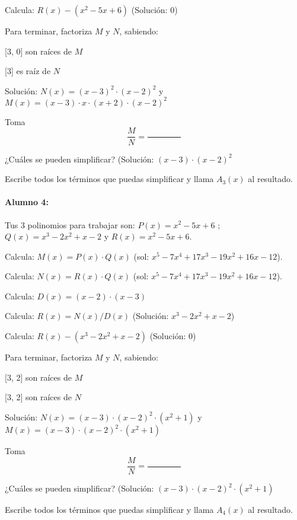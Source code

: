 Calcula: $R(x) - ( x^2 - 5x + 6 )$ (Solución: $ 0 $)

Para terminar, factoriza $M$ y $N$, sabiendo:

     [3, 0]  son raíces de $M$

     [3]  es raíz de $N$

Solución: $N(x) =  (x - 3)^2 \cdot  (x - 2)^2 $ y $M(x) =  (x - 3) \cdot  x \cdot  (x + 2) \cdot  (x - 2)^2 $

Toma \[\frac{M}{N} = \frac{\quad\quad\quad\quad}{\quad\quad\quad\quad}\]

¿Cuáles se pueden simplificar? (Solución: $ (x - 3) \cdot  (x - 2)^2 $

Escribe todos los términos que puedas simplificar y llama $A_3(x)$ al resultado.













\paragraph{Alumno 4:\\}



Tus 3 polinomios para trabajar son: $P(x) =  x^2 - 5x + 6 $ ; $Q(x) =  x^3 - 2x^2 + x - 2 $ y $R(x) =  x^2 - 5x + 6 $.



Calcula: $M(x) = P(x)\cdot  Q(x)$ (sol: $ x^5 - 7x^4 + 17x^3 - 19x^2 + 16x - 12 $).

Calcula: $N(x) = R(x)\cdot  Q(x)$ (sol: $ x^5 - 7x^4 + 17x^3 - 19x^2 + 16x - 12 $).

Calcula: $D(x) = ( x - 2 )\cdot  ( x - 3 )$

Calcula: $R(x) = N(x) / D(x)$ (Solución: $ x^3 - 2x^2 + x - 2 $)

Calcula: $R(x) - ( x^3 - 2x^2 + x - 2 )$ (Solución: $ 0 $)

Para terminar, factoriza $M$ y $N$, sabiendo:

     [3, 2]  son raíces de $M$

     [3, 2]  son raíces de $N$

Solución: $N(x) =  (x - 3) \cdot  (x - 2)^2 \cdot  (x^2 + 1) $ y $M(x) =  (x - 3) \cdot  (x - 2)^2 \cdot  (x^2 + 1) $

Toma \[\frac{M}{N} = \frac{\quad\quad\quad\quad}{\quad\quad\quad\quad}\]

¿Cuáles se pueden simplificar? (Solución: $ (x - 3) \cdot  (x - 2)^2 \cdot  (x^2 + 1) $

Escribe todos los términos que puedas simplificar y llama $A_4(x)$ al resultado.





